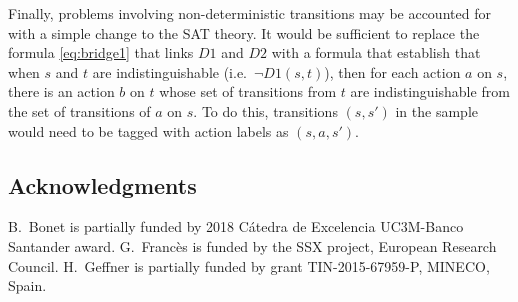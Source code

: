 \documentclass[letterpaper]{article} %
\begin{document}
Finally, problems involving non-deterministic transitions may be
accounted for with a simple change to the SAT theory.
It would be sufficient to replace the formula \eqref{eq:bridge1}
that links $D1$ and $D2$ with a formula that establish that when
$s$ and $t$ are indistinguishable (i.e.\ $\neg D1(s,t)$), then
for each action $a$ on $s$, there is an action $b$ on $t$ whose
set of transitions from $t$ are indistinguishable from the set
of transitions of $a$ on $s$.
To do this, transitions $(s,s')$ in the sample would need to be
tagged with action labels as $(s,a,s')$.

\subsection*{Acknowledgments}
B.\ Bonet is partially funded by 2018 C\'atedra de Excelencia UC3M-Banco Santander award.
G.\ Franc\`{e}s is funded by the SSX project, European Research Council.
H.\ Geffner is partially funded by grant TIN-2015-67959-P, MINECO, Spain.



\end{document}
